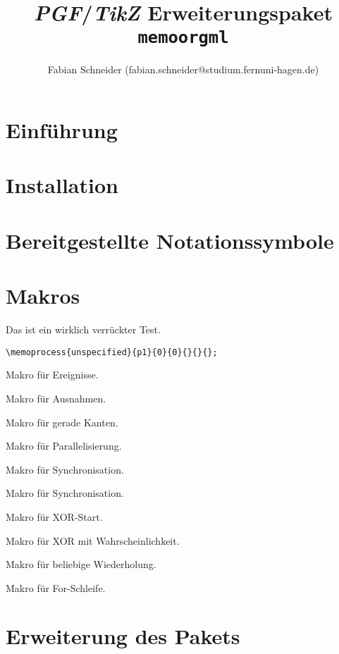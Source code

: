 \documentclass[11pt]{article}
\begin{document}
\begin{titlepage}
\title{\textit{PGF}/\textit{TikZ} Erweiterungspaket \texttt{memoorgml}} 
\author{Fabian Schneider (fabian.schneider@studium.fernuni-hagen.de)}   
\end{titlepage}
\maketitle

\section{Einführung}
\label{sec:Einführung}

\section{Installation}
\label{sec:Installation}

\section{Bereitgestellte Notationssymbole}
\label{sec:Notationssymbole}

\section{Makros}
\label{sec:Makros}
\DescribeMacro{\memoprocess} \medskip

Das ist ein wirklich verrückter Test.
    \begin{lstlisting}
\memoprocess{unspecified}{p1}{0}{0}{}{}{};    
    \end{lstlisting}

    \bigskip

\DescribeMacro{\memoevent} Makro für Ereignisse.\bigskip

\DescribeMacro{\memoexception} Makro für Ausnahmen.\bigskip

\DescribeMacro{\memoconn} Makro für gerade Kanten.\bigskip

\DescribeMacro{\memoparaconn} Makro für Parallelisierung.\bigskip

\DescribeMacro{\memosync} Makro für Synchronisation.\bigskip

\DescribeMacro{\memoconnsync} Makro für Synchronisation.\bigskip

\DescribeMacro{\memoconnxor} Makro für XOR-Start.\bigskip

\DescribeMacro{\memoconnxorprobability} Makro für XOR mit Wahrscheinlichkeit.\bigskip

\DescribeMacro{\memoiterationuntil} Makro für beliebige Wiederholung.\bigskip

\DescribeMacro{\memoiterationloop} Makro für For-Schleife.\bigskip

\section{Erweiterung des Pakets}
\label{sec:Erweiterung}
\end{document}
